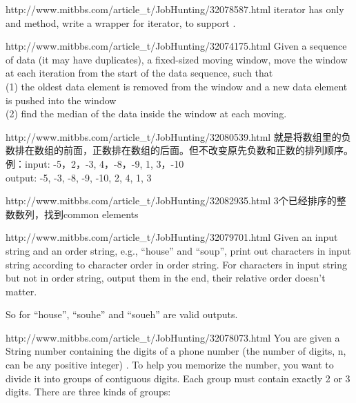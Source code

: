 \documentclass[a4paper]{article}
\newcommand{\ilcode}[1]{
	\framebox[\width]{\texttt{#1}}
}
\begin{document}
\begin{CJK}{UTF8}{gbsn}
\begin{enumerate}
\begin{Q}[Google]{http://www.mitbbs.com/article_t/JobHunting/32078587.html}
iterator has only \ilcode{bool hasNext()} and \ilcode{T next()} method, write a wrapper for iterator, to support \ilcode{peek()}.
\end{Q}

\begin{Q}{http://www.mitbbs.com/article_t/JobHunting/32074175.html}
Given a sequence of data (it may have duplicates), a fixed-sized moving window, move the window at each iteration from the start of the data sequence, such that \\
(1) the oldest data element is removed from the window and a new data element is pushed into the window\\
(2) find the median of the data inside the window at each moving.
\end{Q}

\begin{Q}{http://www.mitbbs.com/article_t/JobHunting/32080539.html}
就是将数组里的负数排在数组的前面，正数排在数组的后面。但不改变原先负数和正数的排列顺序。\\
例：input: -5，2，-3, 4，-8，-9, 1, 3，-10\\
output: -5, -3, -8, -9, -10, 2, 4, 1, 3
\end{Q}

\begin{Q}{http://www.mitbbs.com/article_t/JobHunting/32082935.html}
3个已经排序的整数数列，找到common elements
\end{Q}

\begin{Q}[Google]{http://www.mitbbs.com/article_t/JobHunting/32079701.html}
Given an input string and an order string, e.g., ``house'' and ``soup'', print out characters in input string according to character order in order string. For characters in input string but not in order string, output them in the end, their relative order doesn't matter.

So for ``house'', ``souhe'' and ``soueh'' are valid outputs.
\end{Q}

\begin{Q}[Google]{http://www.mitbbs.com/article_t/JobHunting/32078073.html}
You are given a String number containing the digits of a phone number (the number of digits, n, can be any positive integer) . To help you memorize the number, you want to divide it into groups of contiguous digits. Each group must contain exactly 2 or 3 digits. There are three kinds of groups:


\end{Q}
\end{enumerate}
\end{CJK}
\end{document}
